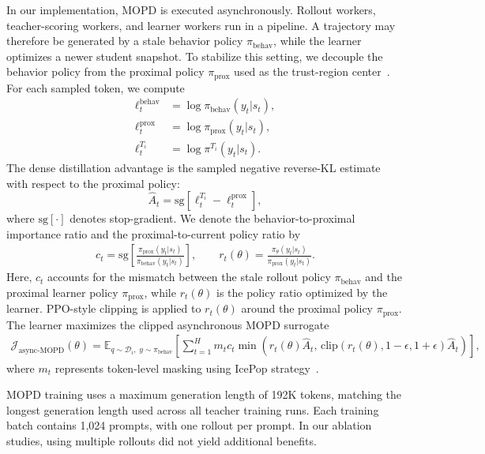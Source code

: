 In our implementation, MOPD is executed asynchronously. Rollout workers,
teacher-scoring workers, and learner workers run in a pipeline. A trajectory
may therefore be generated by a stale behavior policy
$\pi_{\mathrm{behav}}$, while the learner optimizes a newer student snapshot.
To stabilize this setting, we decouple the behavior policy from the proximal
policy $\pi_{\mathrm{prox}}$ used as the trust-region center~\citep{fu2026areal}. For each sampled
token, we compute
\begin{align*}
\ell^{\mathrm{behav}}_t &= \log \pi_{\mathrm{behav}}(y_t|s_t), \\
\ell^{\mathrm{prox}}_t  &= \log \pi_{\mathrm{prox}}(y_t|s_t), \\
\ell^{T_i}_t            &= \log \pi^{T_i}(y_t|s_t).
\end{align*}
The dense distillation advantage is the sampled negative reverse-KL estimate
with respect to the proximal policy:
\begin{equation}
\widehat{A}_t
=
\mathrm{sg}\!\left[
\ell^{T_i}_t - \ell^{\mathrm{prox}}_t
\right],
\label{eq:mopd_advantage}
\end{equation}
where $\mathrm{sg}[\cdot]$ denotes stop-gradient. 
We denote the behavior-to-proximal importance ratio and the proximal-to-current
policy ratio by
\begin{align*}
c_t
=
\mathrm{sg}\!\left[
\frac{\pi_{\mathrm{prox}}(y_t|s_t)}
     {\pi_{\mathrm{behav}}(y_t|s_t)}
\right],
\qquad
r_t(\theta)
=
\frac{\pi_{\theta}(y_t|s_t)}
     {\pi_{\mathrm{prox}}(y_t|s_t)}.
\end{align*}
Here, $c_t$ accounts for the mismatch between the stale rollout policy
$\pi_{\mathrm{behav}}$ and the proximal learner policy $\pi_{\mathrm{prox}}$,
while $r_t(\theta)$ is the policy ratio optimized by the learner. PPO-style
clipping is applied to $r_t(\theta)$ around the proximal policy
$\pi_{\mathrm{prox}}$.
The learner maximizes the clipped asynchronous MOPD surrogate
\begin{align}
\mathcal{J}_{\mathrm{async\text{-}MOPD}}(\theta)
=
\mathbb{E}_{q \sim \mathcal{D}_i,\; y \sim \pi_{\mathrm{behav}}}
\left[
\sum_{t=1}^{H}
m_t c_t
\min\!\left(
r_t(\theta)\widehat{A}_t,\,
\mathrm{clip}\!\left(r_t(\theta),1-\epsilon,1+\epsilon\right)\widehat{A}_t
\right)
\right],
\label{eq:async_mopd}
\end{align}
where $m_t$ represents token-level masking using IcePop strategy~\citep{ring1t}.

MOPD training uses a maximum generation length of 192K tokens, matching the longest generation length used across all teacher training runs. Each training batch contains 1,024 prompts, with one rollout per prompt. In our ablation studies, using multiple rollouts did not yield additional benefits.



